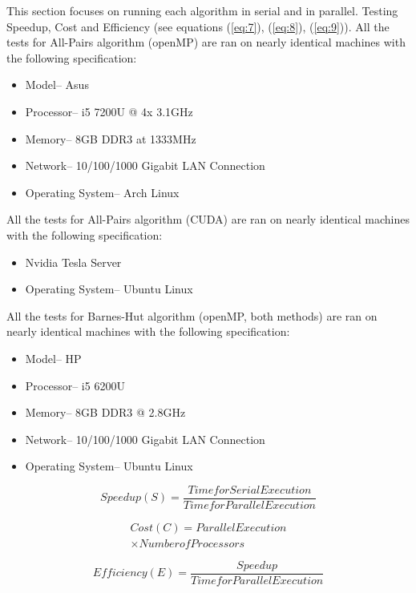 \documentclass[letterpaper, 10 pt, conference]{ieeeconf}
\begin{document}
This section focuses on running each algorithm in serial and in parallel. Testing Speedup, Cost and Efficiency (see equations (\ref{eq:7}), (\ref{eq:8}), (\ref{eq:9})). All the tests for All-Pairs algorithm (openMP) are ran on nearly identical machines with the following specification:
\begin{itemize}
\item Model{--} Asus
\item Processor{--} i5 7200U @ 4x 3.1GHz
\item Memory{--} 8GB DDR3 at 1333MHz
\item Network{--} 10/100/1000 Gigabit LAN Connection
\item Operating System{--} Arch Linux
\end{itemize}

All the tests for All-Pairs algorithm (CUDA) are ran on nearly identical machines with the following specification:
\begin{itemize}
\item Nvidia Tesla Server
\item Operating System{--} Ubuntu Linux
\end{itemize}

All the tests for Barnes-Hut algorithm (openMP, both methods) are ran on nearly identical machines with the following specification:
\begin{itemize}
\item Model{--} HP
\item Processor{--} i5 6200U
\item Memory{--} 8GB DDR3 @ 2.8GHz
\item Network{--} 10/100/1000 Gigabit LAN Connection
\item Operating System{--} Ubuntu Linux
\end{itemize}

\begin{equation} \label{eq:7}
Speedup (S) = \frac{Time for Serial Execution}{Time for Parallel Execution}
\end{equation}

\begin{multline} \label{eq:8}
Cost (C) = Parallel Execution \\
\times Number of Processors
\end{multline}

\begin{equation} \label{eq:9}
Efficiency (E) = \frac{Speedup}{Time for Parallel Execution}
\end{equation}
\end{document}
